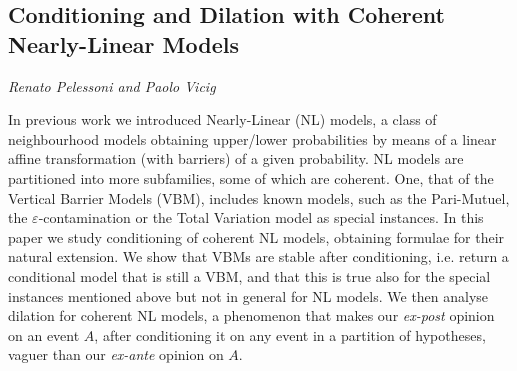 \documentclass[../booklet.tex]{subfiles}
\begin{document}
\subsection[Conditioning and Dilation with Coherent Nearly-Linear Models. {\it Renato Pelessoni and Paolo Vicig}]{Conditioning and Dilation with Coherent Nearly-Linear Models}
 

\begin{center}
  {\it Renato Pelessoni and Paolo Vicig}
\end{center}

\vskip 0.8cm


In previous work \cite{corsato_nearly-linear_2019} we introduced Nearly-Linear (NL) models, a class of neighbourhood models obtaining upper/lower probabilities by means of a linear affine transformation (with barriers) of a given probability.
NL models are partitioned into more subfamilies, some of which are coherent.
One, that of the Vertical Barrier Models (VBM), includes known models, such as the Pari-Mutuel, the $\varepsilon$-contamination or the Total Variation model as special instances.
In this paper we study conditioning of coherent NL models, obtaining formulae for their natural extension.
We show that VBMs are stable after conditioning, i.e. return a conditional model that is still a VBM, and that this is true also for the special instances mentioned above but not in general for NL models. We then analyse dilation for coherent NL models, a phenomenon that makes our \emph{ex-post} opinion on an event $A$, after conditioning it on any event in a partition of hypotheses, vaguer than our \emph{ex-ante} opinion on $A$.

\end{document}
